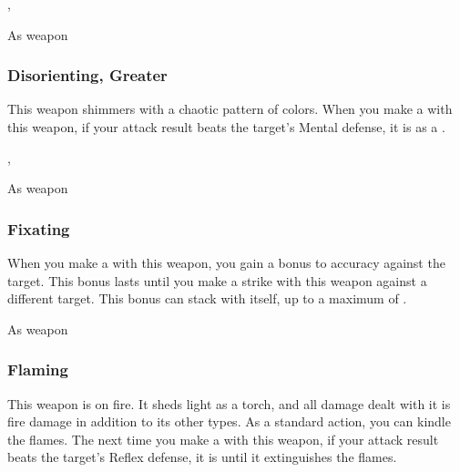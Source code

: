  , 


 As weapon


\lowercase{\hypertarget{item:Disorienting, Greater}{}}\label{item:Disorienting, Greater}
\hypertarget{item:Disorienting, Greater}{\subsubsection{Disorienting, Greater\hfill{}}}

This weapon shimmers with a chaotic pattern of colors.
When you make a  with this weapon, if your attack result beats the target's Mental defense, it is \disoriented as a .



 , 


 As weapon


\lowercase{\hypertarget{item:Fixating}{}}\label{item:Fixating}
\hypertarget{item:Fixating}{\subsubsection{Fixating\hfill{}}}

When you make a  with this weapon, you gain a  bonus to accuracy against the target.
This bonus lasts until you make a strike with this weapon against a different target.
This bonus can stack with itself, up to a maximum of .



 As weapon


\lowercase{\hypertarget{item:Flaming}{}}\label{item:Flaming}
\hypertarget{item:Flaming}{\subsubsection{Flaming\hfill{}}}

This weapon is on fire.
It sheds light as a torch, and all damage dealt with it is fire damage in addition to its other types.
As a standard action, you can kindle the flames.
The next time you make a  with this weapon, if your attack result beats the target's Reflex defense,
it is  until it extinguishes the flames.



 


